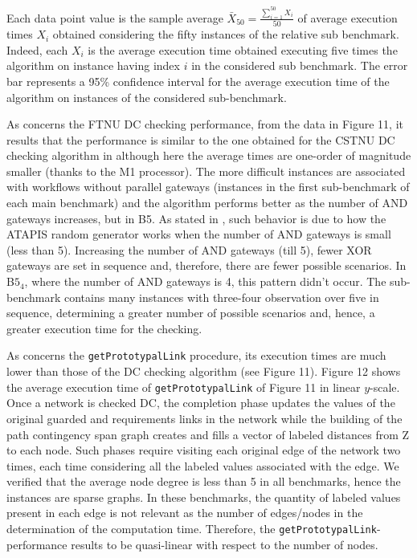 \documentclass[a4paper,11pt]{article}
\begin{document}
Each data point value is the sample average $\bar{X}_{50}=\frac{\sum_{i=1}^{50} X_i}{50}$ of average execution times $X_i$ obtained considering the fifty instances of the relative sub benchmark. 
Indeed, each $X_i$ is the average execution time obtained executing five times the algorithm on instance having index $i$ in the considered sub benchmark.
The error bar represents a 95\% confidence interval for the average execution time of the algorithm on instances of the considered sub-benchmark.


As concerns the FTNU DC checking performance, from the data in Figure 11, it results that the performance is similar to the one obtained for the CSTNU DC checking algorithm in \cite{HunsbergerP18a} although here the average times are one-order of magnitude smaller (thanks to the M1 processor).
The more difficult instances are associated with workflows without parallel gateways (\ie instances in the first sub-benchmark of each
main benchmark) and the algorithm performs better as the number of AND gateways increases, but in B5. 
As stated in \cite{HunsbergerPCSTNUTR18}, such behavior is due to how the ATAPIS random generator works when the number of AND gateways is small (\ie less than 5). Increasing the number of AND gateways (till 5), fewer XOR gateways are set in sequence and, therefore, there are fewer possible scenarios. In B$5_4$, where the number of AND gateways is 4, this pattern didn't occur. The sub-benchmark contains many instances with three-four observation  over five in sequence, determining a greater number of possible scenarios and, hence, a greater execution time for the checking.


As concerns the \texttt{getPrototypalLink} procedure, its execution times are much lower than those of the DC checking algorithm (see Figure 11).
Figure 12 shows the average execution time of \texttt{getPrototypalLink} of Figure 11 in linear $y$-scale.
Once a network is checked DC, the completion phase updates the values of the original guarded and requirements links in the network while the building of the path contingency span graph creates and fills a vector of labeled distances from Z to each node. Such phases require visiting each original edge of the network two times, each time considering all the labeled values associated with the edge. 
We verified that the average node degree is less than 5 in all benchmarks, hence the instances are sparse graphs.  
In these benchmarks, the quantity of labeled values present in each edge is not relevant as the number of edges\slash nodes in the determination of the computation time. Therefore, the \texttt{getPrototypalLink}-performance results to be quasi-linear with respect to the number of nodes.
\end{document}
